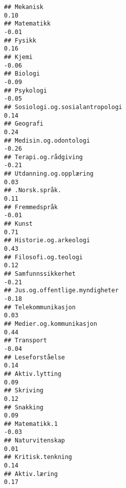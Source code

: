 \documentclass[
]{article}
\begin{document}
\begin{verbatim}
## Mekanisk                                                                          0.10
## Matematikk                                                                       -0.01
## Fysikk                                                                            0.16
## Kjemi                                                                            -0.06
## Biologi                                                                          -0.09
## Psykologi                                                                        -0.05
## Sosiologi.og.sosialantropologi                                                    0.14
## Geografi                                                                          0.24
## Medisin.og.odontologi                                                            -0.26
## Terapi.og.rådgiving                                                              -0.21
## Utdanning.og.opplæring                                                            0.03
## .Norsk.språk.                                                                     0.11
## Fremmedspråk                                                                     -0.01
## Kunst                                                                             0.71
## Historie.og.arkeologi                                                             0.43
## Filosofi.og.teologi                                                               0.12
## Samfunnssikkerhet                                                                -0.21
## Jus.og.offentlige.myndigheter                                                    -0.18
## Telekommunikasjon                                                                 0.03
## Medier.og.kommunikasjon                                                           0.44
## Transport                                                                        -0.04
## Leseforståelse                                                                    0.14
## Aktiv.lytting                                                                     0.09
## Skriving                                                                          0.12
## Snakking                                                                          0.09
## Matematikk.1                                                                     -0.03
## Naturvitenskap                                                                    0.01
## Kritisk.tenkning                                                                  0.14
## Aktiv.læring                                                                      0.17

\end{verbatim}
\end{document}

